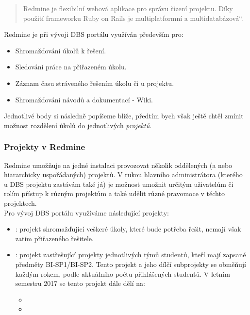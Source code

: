 \begin{quote}
\quotedblbase Redmine je flexibilní webová aplikace pro správu řízení projektu. Díky použití frameworku Ruby on Rails je multiplatformní a multidatabázová\textquotedblleft \cite{redmine}.
\end{quote}

Redmine je při vývoji DBS portálu využíván především pro:
\begin{itemize}
	\item Shromažďování úkolů k řešení.
	\item Sledování práce na přiřazeném úkolu.
	\item Záznam času stráveného řešením úkolu či u projektu.
	\item Shromažďování návodů a dokumentací - Wiki.
\end{itemize}
Jednotlivé body si následně popíšeme blíže, předtím bych však ještě chtěl zmínit možnost rozdělení úkolů do jednotlivých \emph{projektů}.

\subsubsection{Projekty v Redmine} \label{if:redmine:projects}

Redmine umožňuje na jedné instalaci provozovat několik oddělených (a nebo hiararchicky uspořádaných) projektů. V rukou hlavního administrátora (kterého u DBS projektu zastávám také já) je možnost umožnit určitým uživatelům či rolím přístup k různým projektům a také udělit různé pravomoce v těchto projektech.\\
Pro vývoj DBS portálu využíváme následující projekty:
\begin{itemize}
	\item {}: projekt shromažďující veškeré úkoly, které bude potřeba řešit, nemají však zatím přiřazeného řešitele.
	\item {}: projekt zastřešující projekty jednotlivých týmů studentů, kteří mají zapsané předměty BI-SP1/BI-SP2. Tento projekt a jeho dílčí subprojekty se obměňují každým rokem, podle aktuálního počtu přihlášených studentů. V letním semestru 2017 se tento projekt dále dělí na:
	\begin{itemize}
		\item {}
		\item {}
	\end{itemize}
\end{itemize}

